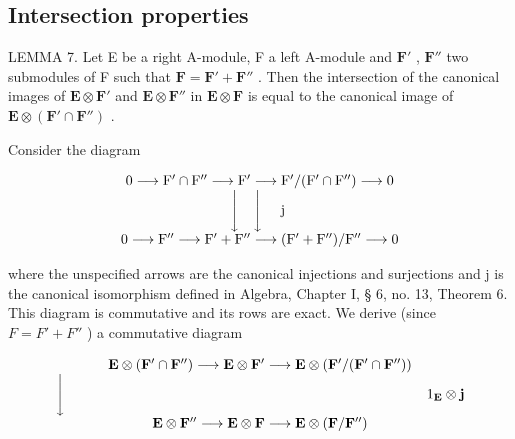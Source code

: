 \subsection{Intersection properties}

LEMMA 7. Let E be a right A-module, F a left A-module and \(\mathbf{F}'\) , \(\mathbf{F}''\) two submodules of F such that \(\mathbf{F} = \mathbf{F}' + \mathbf{F}''\) . Then the intersection of the canonical images of \(\mathbf{E} \otimes \mathbf{F}'\) and \(\mathbf{E} \otimes \mathbf{F}''\) in \(\mathbf{E} \otimes \mathbf{F}\) is equal to the canonical image of \(\mathbf{E} \otimes (\mathbf{F}' \cap \mathbf{F}'')\) .

Consider the diagram

\[
\begin{array}{c} 0 \longrightarrow \mathrm{F} ^ {\prime} \cap \mathrm{F} ^ {\prime \prime} \longrightarrow \mathrm{F} ^ {\prime} \longrightarrow \mathrm{F} ^ {\prime} / (\mathrm{F} ^ {\prime} \cap \mathrm{F} ^ {\prime \prime}) \longrightarrow 0 \\ \Biggl \downarrow \quad \Biggl \downarrow \quad \text {   j   } \\ 0 \longrightarrow \mathrm{F} ^ {\prime \prime} \longrightarrow \mathrm{F} ^ {\prime} + \mathrm{F} ^ {\prime \prime} \longrightarrow (\mathrm{F} ^ {\prime} + \mathrm{F} ^ {\prime \prime}) / \mathrm{F} ^ {\prime \prime} \longrightarrow 0 \end{array}
\]

where the unspecified arrows are the canonical injections and surjections and j is the canonical isomorphism defined in Algebra, Chapter I, § 6, no. 13, Theorem 6. This diagram is commutative and its rows are exact. We derive (since \(F = F' + F''\) ) a commutative diagram

\[
\begin{array}{c} \mathbf {E} \otimes (\mathbf {F} ^ {\prime} \cap \mathbf {F} ^ {\prime \prime}) \longrightarrow \mathbf {E} \otimes \mathbf {F} ^ {\prime} \longrightarrow \mathbf {E} \otimes (\mathbf {F} ^ {\prime} / (\mathbf {F} ^ {\prime} \cap \mathbf {F} ^ {\prime \prime})) \\ \Biggl \downarrow \qquad \qquad \qquad \qquad \qquad \qquad \qquad \qquad \qquad \qquad \qquad \qquad \qquad 1 _ {\mathbf {E}} \otimes \mathbf {j} \\ \mathbf {E} \otimes \mathbf {F} ^ {\prime \prime} \longrightarrow \mathbf {E} \otimes \mathbf {F} \longrightarrow \mathbf {E} \otimes (\mathbf {F} / \mathbf {F} ^ {\prime \prime}) \end{array}
\]

